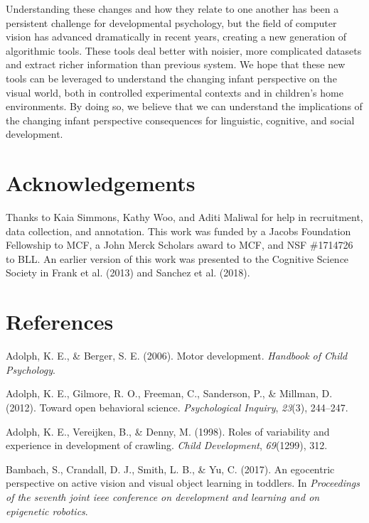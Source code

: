 \documentclass[english,man,floatsintext]{apa6}
\begin{document}
Understanding these changes and how they relate to one another has been
a persistent challenge for developmental psychology, but the field of
computer vision has advanced dramatically in recent years, creating a
new generation of algorithmic tools. These tools deal better with
noisier, more complicated datasets and extract richer information than
previous system. We hope that these new tools can be leveraged to
understand the changing infant perspective on the visual world, both in
controlled experimental contexts and in children's home environments. By
doing so, we believe that we can understand the implications of the
changing infant perspective consequences for linguistic, cognitive, and
social development.

\section{Acknowledgements}\label{acknowledgements}

Thanks to Kaia Simmons, Kathy Woo, and Aditi Maliwal for help in
recruitment, data collection, and annotation. This work was funded by a
Jacobs Foundation Fellowship to MCF, a John Merck Scholars award to MCF,
and NSF \#1714726 to BLL. An earlier version of this work was presented
to the Cognitive Science Society in Frank et al. (2013) and Sanchez et
al. (2018).

\newpage

\section{References}\label{references}

\begingroup
\setlength{\parindent}{-0.5in} \setlength{\leftskip}{0.5in}

\hypertarget{refs}{}
\hypertarget{ref-adolph2006motor}{}
Adolph, K. E., \& Berger, S. E. (2006). Motor development.
\emph{Handbook of Child Psychology}.

\hypertarget{ref-adolph2012toward}{}
Adolph, K. E., Gilmore, R. O., Freeman, C., Sanderson, P., \& Millman,
D. (2012). Toward open behavioral science. \emph{Psychological Inquiry},
\emph{23}(3), 244--247.

\hypertarget{ref-adolph1998roles}{}
Adolph, K. E., Vereijken, B., \& Denny, M. (1998). Roles of variability
and experience in development of crawling. \emph{Child Development},
\emph{69}(1299), 312.

\hypertarget{ref-bambach2017}{}
Bambach, S., Crandall, D. J., Smith, L. B., \& Yu, C. (2017). An
egocentric perspective on active vision and visual object learning in
toddlers. In \emph{Proceedings of the seventh joint ieee conference on
development and learning and on epigenetic robotics}.
\end{document}
